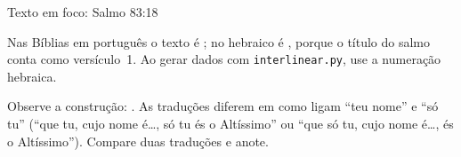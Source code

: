 
\begin{campo}{Texto em foco: Salmo 83:18}
\begin{alerta}[Numeração]
Nas Bíblias em português o texto é ; no hebraico é
, porque o título do salmo conta como versículo~1. Ao gerar dados
com \texttt{interlinear.py}, use a numeração hebraica.
\end{alerta}


Observe a construção: . As
traduções diferem em como ligam \enquote{teu nome} e \enquote{só tu}
(\enquote{que tu, cujo nome é\ldots, só tu és o Altíssimo} ou \enquote{que só
tu, cujo nome é\ldots, és o Altíssimo}). Compare duas traduções e anote.
\end{campo}

